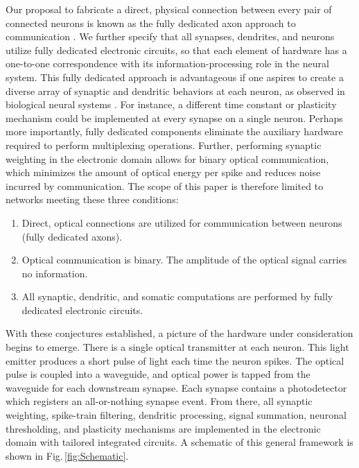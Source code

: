 \documentclass[twocolumn]{article}
\begin{document}
Our proposal to fabricate a direct, physical connection between every pair of connected neurons is known as the fully dedicated axon approach to communication \cite{seda2016}. We further specify that all synapses, dendrites, and neurons utilize fully dedicated electronic circuits, so that each element of hardware has a one-to-one correspondence with its information-processing role in the neural system. This fully dedicated approach is advantageous if one aspires to create a diverse array of synaptic and dendritic behaviors at each neuron, as observed in biological neural systems \cite{marder1987neurotransmitters, euler2001dendritic}. For instance, a different time constant or plasticity mechanism could be implemented at every synapse on a single neuron. Perhaps more importantly, fully dedicated components eliminate the auxiliary hardware required to perform multiplexing operations. Further, performing synaptic weighting in the electronic domain allows for binary optical communication, which minimizes the amount of optical energy per spike and reduces noise incurred by communication. The scope of this paper is therefore limited to networks meeting these three conditions:

\begin{enumerate}
    \item Direct, optical connections are utilized for communication between neurons (fully dedicated axons).
    \item Optical communication is binary. The amplitude of the optical signal carries no information.
    \item All synaptic, dendritic, and somatic computations are performed by fully dedicated electronic circuits.
\end{enumerate}

With these conjectures established, a picture of the hardware under consideration begins to emerge. There is a single optical transmitter at each neuron. This light emitter produces a short pulse of light each time the neuron spikes. The optical pulse is coupled into a waveguide, and optical power is tapped from the waveguide for each downstream synapse. Each synapse contains a photodetector which registers an all-or-nothing synapse event. From there, all synaptic weighting, spike-train filtering, dendritic processing, signal summation, neuronal thresholding, and plasticity mechanisms are implemented in the electronic domain with tailored integrated circuits. A schematic of this general framework is shown in Fig.\,\ref{fig:Schematic}.
\end{document}
